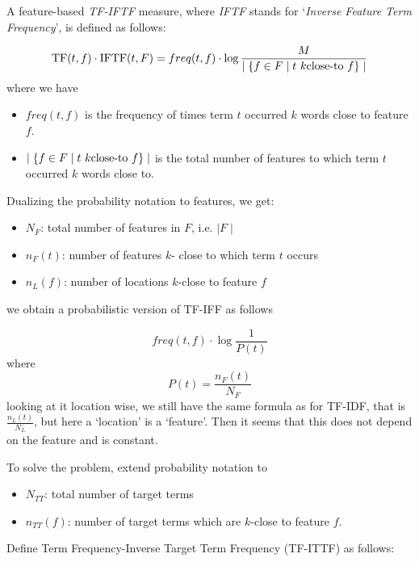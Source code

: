 \begin{definition}
A feature-based  \emph{TF-IFTF}  measure, where \emph{IFTF} stands for `\emph{Inverse Feature Term Frequency}', is defined as follows:

\begin{equation}
\label{tf-iftf}
\textmd{TF}(t,f) \cdot \textmd{IFTF}(t, F) = freq(t, f) \cdot \log{{M} \over {\mid \{f \in F \mid t  \ k\textmd{close-to} \ f \} \mid}}
\end{equation}
where we have
\begin{itemize}
\item $freq(t, f)$ is the frequency of times term $t$ occurred $k$ words close to feature $f$.
\item $\mid \{f \in F \mid t  \ k\textmd{close-to} \ f \} \mid$ is the total number of features to which term $t$ occurred $k$ words close to. 
\end{itemize}

\end{definition}


Dualizing the  probability notation to  features, we get:

\begin{itemize}
\item $N_F$: total number of features in $F$, i.e. $\mid F \mid$
\item  $n_F (t)$: number of features $k$- close to which term $t$ occurs
\item  $n_L(f)$: number of locations $k$-close to feature $f$
\end{itemize}

we obtain a probabilistic version of TF-IFF as follows

\[
freq(t,f) \cdot \log{\frac{1}{P(t)}}
\]
where  
\[
P(t) = \frac{n_F(t)}{N_F}
\]
looking at it location wise, we still have the same formula as for TF-IDF, that is $\frac{n_L(t)}{N_L}$, but here a `location'  is a `feature'.  Then it seems that this does not depend on the feature and is constant. 

To solve the problem,  extend probability notation to
\begin{itemize}
\item $N_{TT}$: total number of target terms
\item  $n_{TT}(f)$: number of target terms which are $k$-close to feature $f$.
\end{itemize}

Define Term Frequency-Inverse Target Term Frequency (TF-ITTF) as follows:

